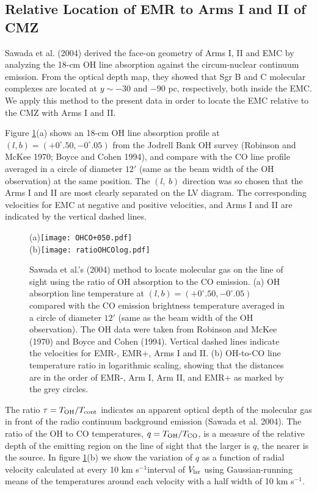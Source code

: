 \documentclass[useAMS,usenatbib]{mn2e}
\def\kms{km s$^{-1}$}
\def\vlsr{V_{\rm lsr}}
\def\deg{^\circ}\def\Deg{^\circ}
\begin{document}
\subsection{Relative Location of EMR to Arms I and II of CMZ}

Sawada et al. (2004) derived the face-on geometry of Arms I, II and EMC by analyzing the 18-cm OH line absorption against the circum-nuclear continuum emission. From the optical depth map, they showed that Sgr B and C molecular complexes are located at $y\sim -30$ and $-90$ pc, respectively, both inside the EMC. We apply this method to the present data in order to locate the EMC relative to the CMZ with Arms I and II.

Figure \ref{OHvsCO}(a) shows an 18-cm OH line absorption profile at $(l,b)=(+0\deg.50, -0\deg.05)$ from the Jodrell Bank OH survey (Robinson and McKee 1970; Boyce and Cohen 1994), and compare with the CO line profile averaged in a circle of diameter $12'$ (same as the beam width of the OH observation) at the same position. The $(l,\ b)$ direction was so chosen that the Arms I and II are most clearly separated on the LV diagram. The corresponding velocities for EMC at negative and positive velocities, and Arms I and II are indicated by the vertical dashed lines. 


\begin{figure} 
\begin{center} 
(a)\texttt{[image: OHCO+050.pdf]}\\
(b)\texttt{[image: ratioOHCOlog.pdf]}  
\end{center}
\caption{Sawada et al.'s (2004) method to locate molecular gas on the line of sight using the ratio of OH absorption to the CO emission. (a) OH absorption line temperature at $(l,b)=(+0\deg.50, -0\deg.05)$ compared with the CO emission brightness temperature averaged in a circle of diameter $12'$ (same as the beam width of the OH observation). The OH data were taken from Robinson and McKee (1970) and Boyce and Cohen (1994). Vertical dashed lines indicate the velocities for EMR-, EMR+, Arms I and II. (b) OH-to-CO line temperature ratio in logarithmic scaling, showing that the distances are in the order of EMR-, Arm I, Arm II, and EMR+ as marked by the grey circles. 
}
 \label{OHvsCO}  
\end{figure}  

The ratio $\tau=T_{\rm OH}/T_{\rm cont}$ indicates an apparent optical depth of the molecular gas in front of the radio continuum background emission (Sawada et al. 2004). The ratio of the OH to CO temperatures, $q=T_{\rm OH}/T_{\rm CO}$, is a measure of the relative depth of the emitting region on the line of sight that the larger is $q$, the nearer is the source. In figure \ref{OHvsCO}(b) we show the variation of $q$ as a function of radial velocity calculated at every 10 \kms interval of $\vlsr$ using Gaussian-running means of the temperatures around each velocity with a half width of 10 \kms. 
\end{document}
